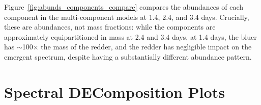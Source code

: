\documentclass[twocolumn,twocolappendix]{aastex63}
\begin{document}
Figure~\ref{fig:abunds_components_compare} compares the abundances of each component in the multi-component models at 1.4, 2.4, and 3.4 days. Crucially, these are abundances, not mass fractions: while the components are approximately equipartitioned in mass at 2.4 and 3.4 days, at 1.4 days, the bluer has $\sim$100$\times$ the mass of the redder, and the redder has negligible impact on the emergent spectrum, despite having a substantially different abundance pattern.










\section{Spectral DEComposition Plots}\label{app:SDEC}
\end{document}
